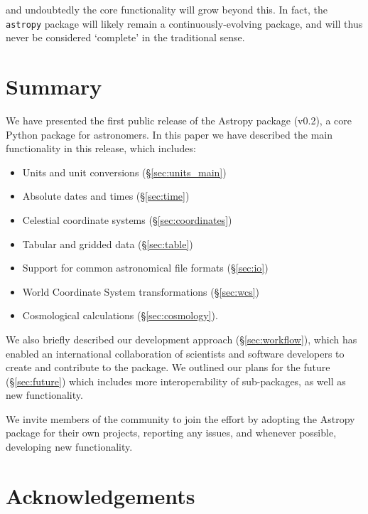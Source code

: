 \documentclass[traditabstract]{aa}
\newcommand{\astropy}{\texttt{astropy}\xspace}
\begin{document}
\noindent and undoubtedly the core functionality will grow beyond this. In
fact, the \astropy package will likely remain a continuously-evolving package,
and will thus never be considered `complete' in the traditional sense.

\section{Summary}

\label{sec:summary}


We have presented the first public release of the Astropy package (v0.2), a
core Python package for astronomers. In this paper we have described the main
functionality in this release, which includes:

\begin{itemize}
\item Units and unit conversions (\S\ref{sec:units_main})
\item Absolute dates and times (\S\ref{sec:time})
\item Celestial coordinate systems (\S\ref{sec:coordinates})
\item Tabular and gridded data (\S\ref{sec:table})
\item Support for common astronomical file formats (\S\ref{sec:io})
\item World Coordinate System transformations (\S\ref{sec:wcs})
\item Cosmological calculations (\S\ref{sec:cosmology}).
\end{itemize}

We also briefly described our development approach (\S\ref{sec:workflow}),
which has enabled an international collaboration of scientists and software
developers to create and contribute to the package. We outlined our plans for
the future (\S\ref{sec:future}) which includes more interoperability of
sub-packages, as well as new functionality.

We invite members of the community to join the effort by adopting the Astropy package for
their own projects, reporting any issues, and whenever possible, developing new
functionality.


\section*{Acknowledgements}

\label{sec:acknowledgements}
\end{document}
